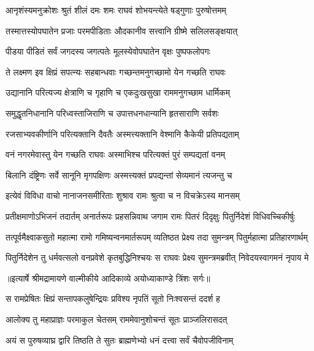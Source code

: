 \twolineshloka
{आनृशंस्यमनुक्रोशः श्रुतं शीलं दमः शमः}
{राघवं शोभयन्त्येते षड्गुणाः पुरुषोत्तमम्} %

\twolineshloka
{तस्मात्तस्योपघातेन प्रजाः परमपीडिताः}
{औदकानीव सत्त्वानि ग्रीष्मे सलिलसङ्क्षयात्} %

\twolineshloka
{पीडया पीडितं सर्वं जगदस्य जगत्पतेः}
{मूलस्येवोपघातेन वृक्षः पुष्पफलोपगः} %

\twolineshloka
{ते लक्ष्मण इव क्षिप्रं सपत्न्यः सहबान्धवाः}
{गच्छन्तमनुगच्छामो येन गच्छति राघवः} %

\twolineshloka
{उद्यानानि परित्यज्य क्षेत्राणि च गृहाणि च}
{एकदुःखसुखा राममनुगच्छाम धार्मिकम्} %

\twolineshloka
{समुद्धृतनिधानानि परिध्वस्ताजिराणि च}
{उपात्तधनधान्यानि हृतसाराणि सर्वशः} %

\twolineshloka
{रजसाभ्यवकीर्णानि परित्यक्तानि दैवतैः}
{अस्मत्त्यक्तानि वेश्मानि कैकेयी प्रतिपद्यताम्} %

\twolineshloka
{वनं नगरमेवास्तु येन गच्छति राघवः}
{अस्माभिश्च परित्यक्तं पुरं सम्पद्यतां वनम्} %

\twolineshloka
{बिलानि दंष्ट्रिणः सर्वे सानूनि मृगपक्षिणः}
{अस्मत्त्यक्तं प्रपद्यन्तां सेव्यमानं त्यजन्तु च} %

\twolineshloka
{इत्येवं विविधा वाचो नानाजनसमीरिताः}
{शुश्राव रामः श्रुत्वा च न विचक्रेऽस्य मानसम्} %

\fourlineindentedshloka
{प्रतीक्षमाणोऽभिजनं तदार्तम्}
{अनार्तरूपः प्रहसन्निवाथ}
{जगाम रामः पितरं दिदृक्षुः}
{पितुर्निदेशं विधिवच्चिकीर्षुः} %

\fourlineindentedshloka
{तत्पूर्वमैक्ष्वाकसुतो महात्मा}
{रामो गमिष्यन्वनमार्तरूपम्}
{व्यतिष्ठत प्रेक्ष्य तदा सुमन्त्रम्}
{पितुर्महात्मा प्रतिहारणार्थम्} %

\fourlineindentedshloka
{पितुर्निदेशेन तु धर्मवत्सलो}
{वनप्रवेशे कृतबुद्धिनिश्चयः}
{स राघवः प्रेक्ष्य सुमन्त्रमब्रवीत्}
{निवेदयस्वागमनं नृपाय मे} %


{॥इत्यार्षे श्रीमद्रामायणे वाल्मीकीये आदिकाव्ये अयोध्याकाण्डे त्रिंशः सर्गः॥}


\twolineshloka
{स रामप्रेषितः क्षिप्रं सन्तापकलुषेन्द्रियः}
{प्रविश्य नृपतिं सूतो निःश्वसन्तं ददर्श ह} %

\twolineshloka
{आलोक्य तु महाप्राज्ञः परमाकुल चेतसम्}
{राममेवानुशोचन्तं सूतः प्राञ्जलिरासदत्} %

\twolineshloka
{अयं स पुरुषव्याघ्र द्वारि तिष्ठति ते सुतः}
{ब्राह्मणेभ्यो धनं दत्त्वा सर्वं चैवोपजीविनाम्} %

